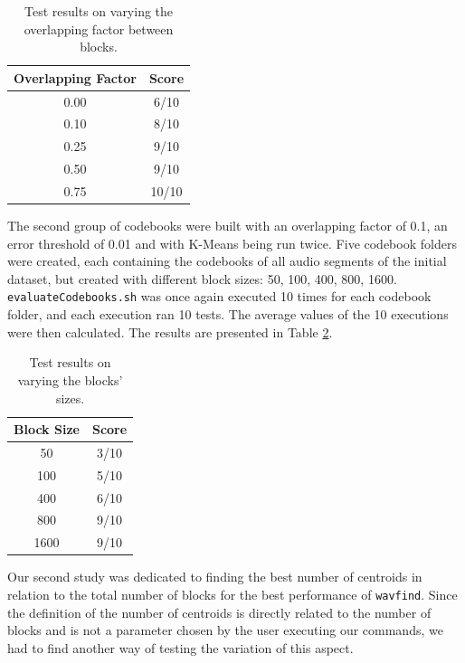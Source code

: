 \documentclass[12pt]{article}
\begin{document}
\begin{table}[H]
  \begin{center}
    \begin{tabular}{c|c}
      \textbf{Overlapping Factor} & \textbf{Score}\\
      \hline
      0.00 & 6/10\\
      0.10 & 8/10\\
      0.25 & 9/10\\
      0.50 & 9/10\\
      0.75 & 10/10\\
    \end{tabular}
  \end{center}
  \caption{Test results on varying the overlapping factor between blocks.}
  \label{tab:overlapFactor}
\end{table}

The second group of codebooks were built with an overlapping factor of 0.1, an 
error threshold of 0.01 and with K-Means being run twice.
Five codebook folders were created, each containing the codebooks of all audio
segments of the initial dataset, but created with different block sizes:
50, 100, 400, 800, 1600. 
\texttt{evaluateCodebooks.sh} was once again executed 10 times for each codebook
folder, and each execution ran 10 tests.
The average values of the 10 executions were then calculated.
The results are presented in Table \ref{tab:blockSize}.

\begin{table}[H]
  \begin{center}
    \begin{tabular}{c|c}
      \textbf{Block Size} & \textbf{Score}\\
      \hline
      50 & 3/10\\
      100 & 5/10\\
      400 & 6/10\\
      800 & 9/10\\
      1600 & 9/10\\
    \end{tabular}
  \end{center}
  \caption{Test results on varying the blocks' sizes.}
  \label{tab:blockSize}
\end{table}

Our second study was dedicated to finding the best number of centroids in relation
to the total number of blocks for the best performance of \texttt{wavfind}.
Since the definition of the number of centroids is directly related to the number
of blocks and is not a parameter chosen by the user executing our commands,
we had to find another way of testing the variation of this aspect.
\end{document}
